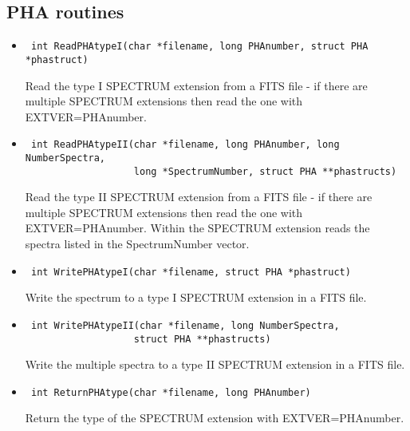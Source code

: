 \documentclass[11pt]{book}
\begin{document}
\subsection{PHA routines}

\begin{itemize}

\item      \begin{verbatim} int ReadPHAtypeI(char *filename, long PHAnumber, struct PHA *phastruct)\end{verbatim}

               Read the type I SPECTRUM extension from a FITS file -
               if there are multiple SPECTRUM extensions then read the
               one with EXTVER=PHAnumber.

\item      \begin{verbatim} int ReadPHAtypeII(char *filename, long PHAnumber, long NumberSpectra,
                   long *SpectrumNumber, struct PHA **phastructs)\end{verbatim}

               Read the type II SPECTRUM extension from a FITS file - 
               if there are multiple SPECTRUM extensions then read the
               one with EXTVER=PHAnumber. Within the SPECTRUM extension reads the
               spectra listed in the SpectrumNumber vector.

\item      \begin{verbatim} int WritePHAtypeI(char *filename, struct PHA *phastruct)\end{verbatim}

               Write the spectrum to a type I SPECTRUM extension in a FITS file.

\item      \begin{verbatim} int WritePHAtypeII(char *filename, long NumberSpectra, 
                   struct PHA **phastructs)\end{verbatim}

               Write the multiple spectra to a type II SPECTRUM
               extension in a FITS file.

\item      \begin{verbatim} int ReturnPHAtype(char *filename, long PHAnumber)\end{verbatim}

               Return the type of the SPECTRUM extension with EXTVER=PHAnumber.


\end{itemize}
\end{document}
